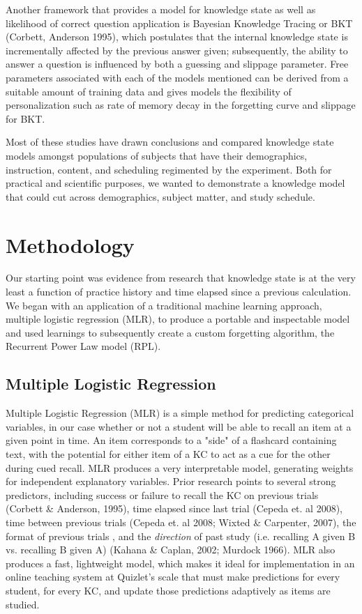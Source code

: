 \documentclass[a4paper,12pt]{article}
\begin{document}
	Another framework that provides a model for knowledge state as well as likelihood of correct question application is Bayesian Knowledge Tracing or BKT (Corbett, Anderson 1995), which postulates that the internal knowledge state is incrementally affected by the previous answer given; subsequently, the ability to answer a question is influenced by both a guessing and slippage parameter. Free parameters associated with each of the models mentioned can be derived from a suitable amount of training data and gives models the flexibility of personalization such as rate of memory decay in the forgetting curve and slippage for BKT.

Most of these studies have drawn conclusions and compared knowledge state models amongst populations of subjects that have their demographics, instruction, content, and scheduling regimented by the experiment. Both for practical and scientific purposes, we wanted to demonstrate a knowledge model that could cut across demographics, subject matter, and study schedule. 

\section{Methodology}
Our starting point was evidence from research that knowledge state is at the very least a function of practice history and time elapsed since a previous calculation. We began with an application of a traditional machine learning approach, multiple logistic regression (MLR), to produce a portable and inspectable model and used learnings to subsequently create a custom forgetting algorithm, the Recurrent Power Law model (RPL). 

\subsection{Multiple Logistic Regression}
Multiple Logistic Regression (MLR) is a simple method for predicting categorical variables, in our case whether or not a student will be able to recall an item at a given point in time. An item corresponds to a "side" of a flashcard containing text, with the potential for either item of a KC to act as a cue for the other during cued recall. MLR produces a very interpretable model, generating weights for independent explanatory variables. Prior research points to several strong predictors, including success or failure to recall the KC on previous trials (Corbett \& Anderson, 1995), time elapsed since last trial (Cepeda et. al 2008), time between previous trials (Cepeda et. al 2008; Wixted \& Carpenter, 2007), the format of previous trials , and the \textit{direction} of past study (i.e. recalling A given B vs. recalling B given A) (Kahana \& Caplan, 2002; Murdock 1966). MLR also produces a fast, lightweight model, which makes it ideal for implementation in an online teaching system at Quizlet's scale that must make predictions for every student, for every KC, and update those predictions adaptively as items are studied.
\end{document}
